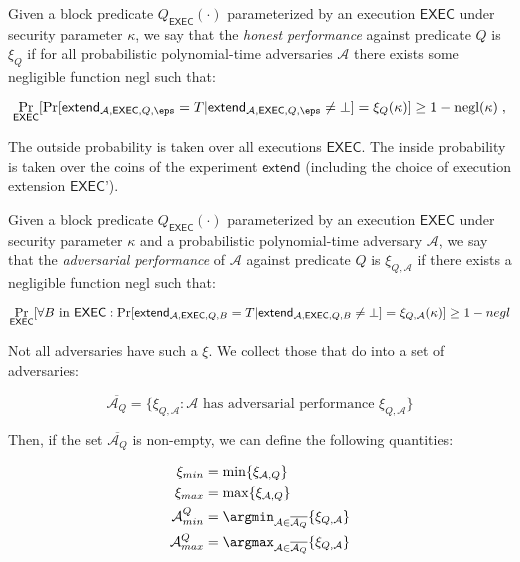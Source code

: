 \begin{definition}
	Given a block predicate $Q_{\textsf{EXEC}}(\cdot)$ parameterized by an
	execution
	$\textsf{EXEC}$ under security parameter $\kappa$, we say that the
	\emph{honest performance} against predicate $Q$ is $\xi_Q$ if for all
	probabilistic polynomial-time adversaries $\mathcal{A}$ there exists some
	negligible function negl such that:

	\[
		\Pr_{\textsf{EXEC}}[
			\Pr[\textsf{extend}_{\mathcal{A},\textsf{EXEC},Q,\eps} = T|\textsf{extend}_{\mathcal{A},\textsf{EXEC},Q,\eps} \neq \bot] = \xi_Q(\kappa)
		] \geq 1 - \text{negl}(\kappa)
		\; ,
	\]

	The outside
	probability is taken over all executions $\textsf{EXEC}$.
	The inside probability is taken over the coins of the experiment
	$\textsf{extend}$ (including the choice of execution extension
	$\textsf{EXEC'}$).
\end{definition}

\begin{definition}
	Given a block predicate $Q_{\textsf{EXEC}}(\cdot)$ parameterized by an
	execution
	$\textsf{EXEC}$ under security parameter $\kappa$ and a probabilistic
	polynomial-time adversary $\mathcal{A}$, we say that the \emph{adversarial performance}
	of $\mathcal{A}$ against predicate $Q$ is $\xi_{Q,\mathcal{A}}$ if there exists a
	negligible function negl such that:

	\[
		\Pr_{\textsf{EXEC}}[
			\forall B \text{ in } \textsf{EXEC}: \Pr[\textsf{extend}_{\mathcal{A},\textsf{EXEC},Q,B} = T|\textsf{extend}_{\mathcal{A},\textsf{EXEC},Q,B} \neq \bot] = \xi_{Q,\mathcal{A}}(\kappa)
		] \geq 1 - negl\\
	\]

	Not all adversaries have such a $\xi$. We collect those that do into a set of
	adversaries:

	\[
		\overline{\mathcal{A}_Q} = \{\xi_{Q,\mathcal{A}}: \mathcal{A} \text{ has adversarial performance } \xi_{Q,\mathcal{A}}\}
	\]

	Then, if the set $\overline{\mathcal{A}_Q}$ is non-empty, we can define the
	following quantities:

	\begin{align*}
		\xi_{min} &= \min\{\xi_{\mathcal{A},Q}\}\\
		\xi_{max} &= \max\{\xi_{\mathcal{A},Q}\}\\
		\mathcal{A}^Q_{min} &= \argmin_{\mathcal{A} \in \overline{\mathcal{A}_Q}}\{\xi_{Q,\mathcal{A}}\}\\
		\mathcal{A}^Q_{max} &= \argmax_{\mathcal{A} \in \overline{\mathcal{A}_Q}}\{\xi_{Q,\mathcal{A}}\}
	\end{align*}
\end{definition}

